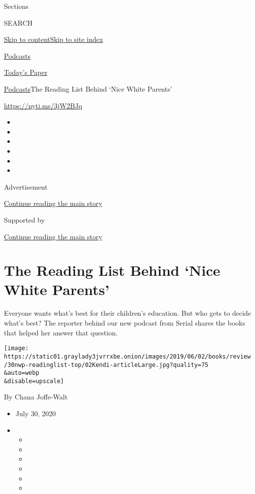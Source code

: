Sections

SEARCH

\protect\hyperlink{site-content}{Skip to
content}\protect\hyperlink{site-index}{Skip to site index}

\href{https://www.nytimes3xbfgragh.onion/spotlight/podcasts}{Podcasts}

\href{https://myaccount.nytimes3xbfgragh.onion/auth/login?response_type=cookie\&client_id=vi}{}

\href{https://www.nytimes3xbfgragh.onion/section/todayspaper}{Today's
Paper}

\href{/spotlight/podcasts}{Podcasts}\textbar{}The Reading List Behind
`Nice White Parents'

\href{https://nyti.ms/3jW2BJq}{https://nyti.ms/3jW2BJq}

\begin{itemize}
\item
\item
\item
\item
\item
\item
\end{itemize}

Advertisement

\protect\hyperlink{after-top}{Continue reading the main story}

Supported by

\protect\hyperlink{after-sponsor}{Continue reading the main story}

\hypertarget{the-reading-list-behind-nice-white-parents}{%
\section{The Reading List Behind `Nice White
Parents'}\label{the-reading-list-behind-nice-white-parents}}

Everyone wants what's best for their children's education. But who gets
to decide what's best? The reporter behind our new podcast from Serial
shares the books that helped her answer that question.

\texttt{[image: https://static01.graylady3jvrrxbe.onion/images/2019/06/02/books/review/30nwp-readinglist-top/02Kendi-articleLarge.jpg?quality=75\\\&auto=webp\\\&disable=upscale]}

By Chana Joffe-Walt

\begin{itemize}
\item
  July 30, 2020
\item
  \begin{itemize}
  \item
  \item
  \item
  \item
  \item
  \item
  \end{itemize}
\end{itemize}

